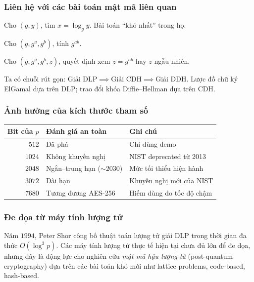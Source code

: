 \documentclass[../DoAn.tex]{subfiles}
\begin{document}
\subsubsection{Liên hệ với các bài toán mật mã liên quan}

\begin{description}[leftmargin=*]
	\item[\textbf{DLP}.] Cho $(g, y)$, tìm $x = \log_g y$. Bài toán ``khó nhất'' trong họ.
	\item[\textbf{CDH} (Computational Diffie--Hellman).] Cho $(g, g^a, g^b)$, tính $g^{ab}$.
	\item[\textbf{DDH} (Decisional Diffie--Hellman).] Cho $(g, g^a, g^b, z)$, quyết định xem $z = g^{ab}$ hay $z$ ngẫu nhiên.
\end{description}

Ta có chuỗi rút gọn: $\text{Giải DLP} \implies \text{Giải CDH} \implies \text{Giải DDH}$. Lược đồ chữ ký ElGamal dựa trên DLP; trao đổi khóa Diffie--Hellman dựa trên CDH.

\subsubsection{Ảnh hưởng của kích thước tham số}

\begin{center}
\renewcommand{\arraystretch}{1.2}
\begin{tabular}{rll}
\toprule
\textbf{Bit của $p$} & \textbf{Đánh giá an toàn} & \textbf{Ghi chú} \\
\midrule
$512$  & Đã phá            & Chỉ dùng demo \\
$1024$ & Không khuyến nghị & NIST deprecated từ 2013 \\
$2048$ & Ngắn--trung hạn ($\sim 2030$) & Mức tối thiểu hiện hành \\
$3072$ & Dài hạn           & Khuyến nghị mới của NIST \\
$7680$ & Tương đương AES-256 & Hiếm dùng do tốc độ chậm \\
\bottomrule
\end{tabular}
\end{center}

\subsubsection{Đe dọa từ máy tính lượng tử}

Năm $1994$, Peter Shor công bố thuật toán lượng tử giải DLP trong thời gian đa thức $O(\log^3 p)$. Các máy tính lượng tử thực tế hiện tại chưa đủ lớn để đe dọa, nhưng đây là động lực cho nghiên cứu \emph{mật mã hậu lượng tử} (post-quantum cryptography) dựa trên các bài toán khó mới như lattice problems, code-based, hash-based.
\end{document}
